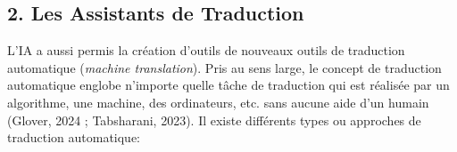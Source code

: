 \documentclass[
  letterpaper,
  DIV=11,
  numbers=noendperiod]{scrreprt}
\newenvironment{Shaded}{\begin{snugshade}}{\end{snugshade}}
\newcommand{\AttributeTok}[1]{\textcolor[rgb]{0.40,0.45,0.13}{#1}}
\newcommand{\CommentTok}[1]{\textcolor[rgb]{0.37,0.37,0.37}{#1}}
\newcommand{\FunctionTok}[1]{\textcolor[rgb]{0.28,0.35,0.67}{#1}}
\newcommand{\NormalTok}[1]{\textcolor[rgb]{0.00,0.23,0.31}{#1}}
\newcommand{\OtherTok}[1]{\textcolor[rgb]{0.00,0.23,0.31}{#1}}
\newcommand{\SpecialCharTok}[1]{\textcolor[rgb]{0.37,0.37,0.37}{#1}}
\newcommand{\StringTok}[1]{\textcolor[rgb]{0.13,0.47,0.30}{#1}}
\begin{document}
\begin{Shaded}
\end{Shaded}

\hypertarget{les-assistants-de-traduction}{%
\subsection{2. Les Assistants de
Traduction}\label{les-assistants-de-traduction}}

L'IA a aussi permis la création d'outils de nouveaux outils de
traduction automatique (\emph{machine translation}). Pris au sens large,
le concept de traduction automatique englobe n'importe quelle tâche de
traduction qui est réalisée par un algorithme, une machine, des
ordinateurs, etc. sans aucune aide d'un humain (Glover, 2024 ;
Tabsharani, 2023). Il existe différents types ou approches de traduction
automatique:
\end{document}
